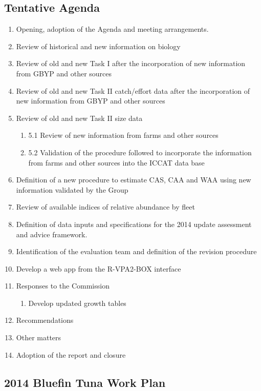 \subsection{Tentative Agenda}

\begin{enumerate}[1.]
\item Opening, adoption of the Agenda and meeting arrangements.
\item Review of historical and new information on biology
\item Review of old and new Task I after the incorporation of new information from GBYP and other sources
\item Review of old and new Task II catch/effort data after the incorporation of new information from GBYP and other sources 
\item Review of old and new Task II size data 

\begin{enumerate}[5.1]
\item 5.1 Review of new information from farms and other sources
\item 5.2 Validation of the procedure followed to incorporate the information from farms and other sources into the ICCAT data base
\end{enumerate}

\item Definition of a new procedure to estimate CAS, CAA and WAA using new information validated by the Group
\item Review of available indices of relative abundance by fleet 
\item Definition of data inputs and specifications for the 2014 update assessment and advice framework.  
\item Identification of the evaluation team and definition of the revision procedure
\item  Develop a web app from the R-VPA2-BOX interface
\item Responses to the Commission
\begin{enumerate}[11.1]
\item Develop updated growth tables
\end{enumerate}
\item Recommendations
\item Other matters
\item Adoption of the report and closure
\end{enumerate}

\subsection{2014 Bluefin Tuna Work Plan}

